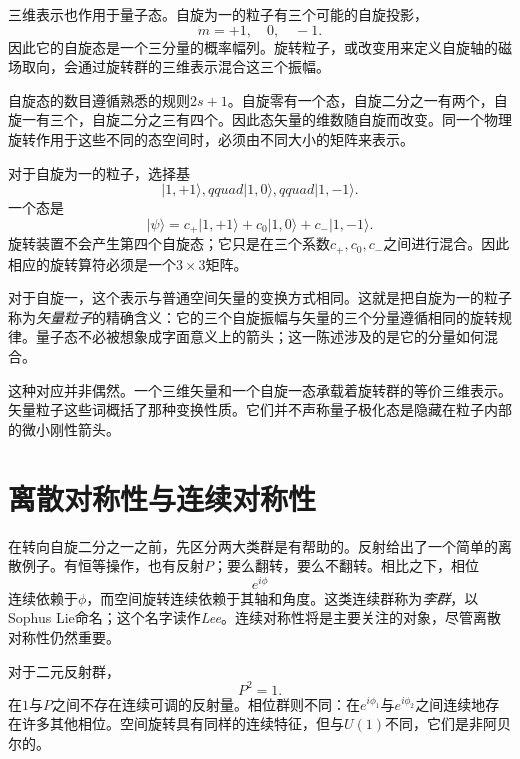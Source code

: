 三维表示也作用于量子态。自旋为一的粒子有三个可能的自旋投影，
\begin{equation}
m=+1,\quad 0,\quad -1.
\end{equation}
因此它的自旋态是一个三分量的概率幅列。旋转粒子，或改变用来定义自旋轴的磁场取向，会通过旋转群的三维表示混合这三个振幅。

自旋态的数目遵循熟悉的规则\(2s+1\)。自旋零有一个态，自旋二分之一有两个，自旋一有三个，自旋二分之三有四个。因此态矢量的维数随自旋而改变。同一个物理旋转作用于这些不同的态空间时，必须由不同大小的矩阵来表示。

对于自旋为一的粒子，选择基
\begin{equation}
\lvert 1,+1\rangle,qquad
\lvert 1,0\rangle,qquad
\lvert 1,-1\rangle.
\end{equation}
一个态是
\begin{equation}
\lvert\psi\rangle
=c_{+}\lvert1,+1\rangle+c_0\lvert1,0\rangle+c_{-}\lvert1,-1\rangle.
\end{equation}
旋转装置不会产生第四个自旋态；它只是在三个系数\(c_+,c_0,c_-\)之间进行混合。因此相应的旋转算符必须是一个\(3\times3\)矩阵。

对于自旋一，这个表示与普通空间矢量的变换方式相同。这就是把自旋为一的粒子称为\emph{矢量粒子}的精确含义：它的三个自旋振幅与矢量的三个分量遵循相同的旋转规律。量子态不必被想象成字面意义上的箭头；这一陈述涉及的是它的分量如何混合。

这种对应并非偶然。一个三维矢量和一个自旋一态承载着旋转群的等价三维表示。{矢量粒子}这些词概括了那种变换性质。它们并不声称量子极化态是隐藏在粒子内部的微小刚性箭头。

\section{离散对称性与连续对称性}

在转向自旋二分之一之前，先区分两大类群是有帮助的。反射给出了一个简单的离散例子。有恒等操作，也有反射\(P\)；要么翻转，要么不翻转。相比之下，相位
\begin{equation}
e^{i\phi}
\end{equation}
连续依赖于\(\phi\)，而空间旋转连续依赖于其轴和角度。这类连续群称为\emph{李群}，以Sophus Lie命名；这个名字读作\emph{Lee}。连续对称性将是主要关注的对象，尽管离散对称性仍然重要。

对于二元反射群，
\begin{equation}
P^2=1.
\end{equation}
在\(1\)与\(P\)之间不存在连续可调的反射量。相位群则不同：在\(e^{i\phi_1}\)与\(e^{i\phi_2}\)之间连续地存在许多其他相位。空间旋转具有同样的连续特征，但与\(U(1)\)不同，它们是非阿贝尔的。

